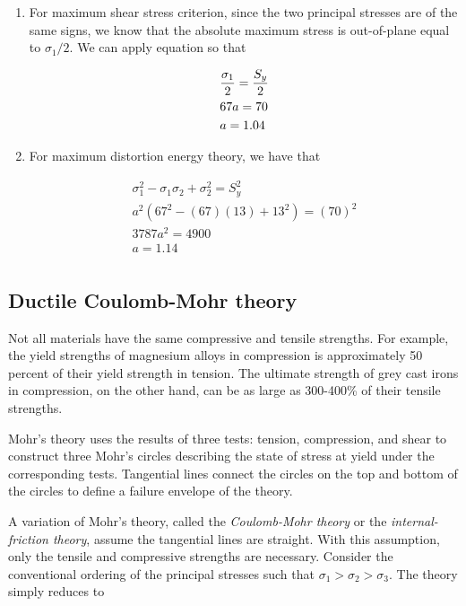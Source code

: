 \documentclass[
fontsize=10pt,
a4paper,
twosides=false,
open=any,
svgnames,
]{kaobook} %
\begin{document}
\begin{example}
  \begin{enumerate}
  \item For maximum shear stress criterion, since the two principal stresses are of the same signs, we know that the absolute maximum stress is out-of-plane equal to $\sigma_1/2$. We can apply equation so that
    
    \[\begin{gathered}
        \frac{\sigma_1}{2} = \frac{S_y}{2} \hfill \\
        67a = 70 \hfill \\
        a = 1.04 \hfill \\ 
      \end{gathered} \]
    
  \item For maximum distortion energy theory, we have that
    
    \[\begin{gathered}
        \sigma_1^2 -\sigma_1\sigma_2 + \sigma_2^2 = S_y^2 \\ 
        a^2 \left( 67^2 - (67)(13) + 13^2 \right) = (70)^2 \\ 
        3787a^2 = 4900 \\ 
        a = 1.14 \\ 
      \end{gathered} \]
    \end{enumerate}
\end{example}

\subsection{Ductile Coulomb-Mohr theory}

Not all materials have the same compressive and tensile strengths. For example, the yield strengths of magnesium alloys in compression is approximately 50 percent of their yield strength in tension. The ultimate strength of grey cast irons in compression, on the other hand, can be as large as 300-400\% of their tensile strengths.

Mohr’s theory uses the results of three tests: tension, compression, and shear to construct three Mohr’s circles describing the state of stress at yield under the corresponding tests. Tangential lines connect the circles on the top and bottom of the circles to define a failure envelope of the theory.

A variation of Mohr’s theory, called the \emph{Coulomb-Mohr theory} or the \emph{internal-friction theory}, assume the tangential lines are straight. With this assumption, only the tensile and compressive strengths are necessary. Consider the conventional ordering of the principal stresses such that $\sigma_1 > \sigma_2 > \sigma_3$. The theory simply reduces to 
\end{document}
